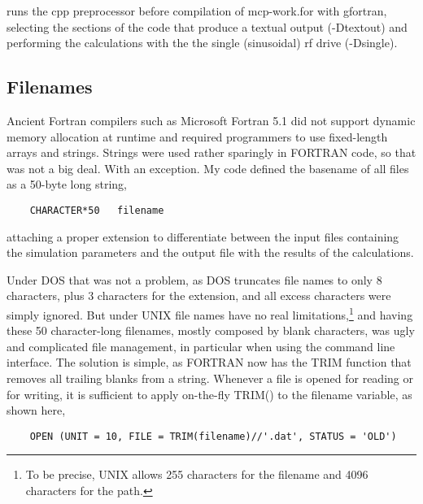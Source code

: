 runs the \textsf{cpp} preprocessor before compilation of \textsf{mcp-work.for} with gfortran, selecting the sections of the code that produce a textual output (\textsf{-Dtextout}) and performing the calculations with the the single (sinusoidal) rf drive (\textsf{-Dsingle}).



\subsection{Filenames}

Ancient Fortran compilers such as Microsoft Fortran 5.1 did not support dynamic memory allocation at runtime and required programmers to use fixed-length arrays and strings. Strings were used rather sparingly in FORTRAN code, so that was not a big deal. With an exception. My code defined the basename of all files as a 50-byte long string,

\begin{lstlisting}
	CHARACTER*50   filename
\end{lstlisting}


attaching a proper extension to differentiate between the input files containing the simulation parameters and the output file with the results of the calculations.

Under DOS that was not a problem, as DOS truncates file names to only 8 characters, plus 3 characters for the extension, and all excess characters were simply ignored. But under UNIX file names have no real limitations,\footnote{To be precise, UNIX allows 255 characters for the filename and 4096 characters for the path.} and having these 50 character-long filenames, mostly composed by blank characters, was ugly and complicated file management, in particular when using the command line interface.
The solution is simple, as FORTRAN now has the \textsf{TRIM} function that removes all trailing blanks from a string. Whenever a file is opened for reading or for writing, it is sufficient to apply on-the-fly \textsf{TRIM()} to the \textsf{filename} variable, as shown here,

\begin{lstlisting}
	OPEN (UNIT = 10, FILE = TRIM(filename)//'.dat', STATUS = 'OLD')
\end{lstlisting}

